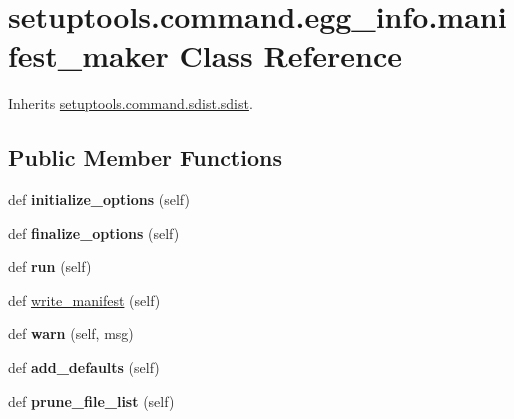 \hypertarget{classsetuptools_1_1command_1_1egg__info_1_1manifest__maker}{}\section{setuptools.\+command.\+egg\+\_\+info.\+manifest\+\_\+maker Class Reference}
\label{classsetuptools_1_1command_1_1egg__info_1_1manifest__maker}


Inherits \hyperlink{classsetuptools_1_1command_1_1sdist_1_1sdist}{setuptools.\+command.\+sdist.\+sdist}.

\subsection*{Public Member Functions}
\begin{DoxyCompactItemize}
\item 
\mbox{\label{classsetuptools_1_1command_1_1egg__info_1_1manifest__maker_ab7483578356eab12661fbdb5a51983bf}} 
def {\bfseries initialize\+\_\+options} (self)
\item 
\mbox{\label{classsetuptools_1_1command_1_1egg__info_1_1manifest__maker_ae871c5da5ea7e0eafb63b5689b480109}} 
def {\bfseries finalize\+\_\+options} (self)
\item 
\mbox{\label{classsetuptools_1_1command_1_1egg__info_1_1manifest__maker_a1c18c0ba4fc94bcc22cb99acdf4e26e7}} 
def {\bfseries run} (self)
\item 
def \hyperlink{classsetuptools_1_1command_1_1egg__info_1_1manifest__maker_abb201f5da34012395bbc74a7294f193b}{write\+\_\+manifest} (self)
\item 
\mbox{\label{classsetuptools_1_1command_1_1egg__info_1_1manifest__maker_a6d4e84dac2e0fa3473f8b9cfa9e942ed}} 
def {\bfseries warn} (self, msg)
\item 
\mbox{\label{classsetuptools_1_1command_1_1egg__info_1_1manifest__maker_a5bb8f3befc6b69fe079f67aa239e7ef5}} 
def {\bfseries add\+\_\+defaults} (self)
\item 
\mbox{\label{classsetuptools_1_1command_1_1egg__info_1_1manifest__maker_a13f763590dea4d794ab518fe896bafa6}} 
def {\bfseries prune\+\_\+file\+\_\+list} (self)
\end{DoxyCompactItemize}
